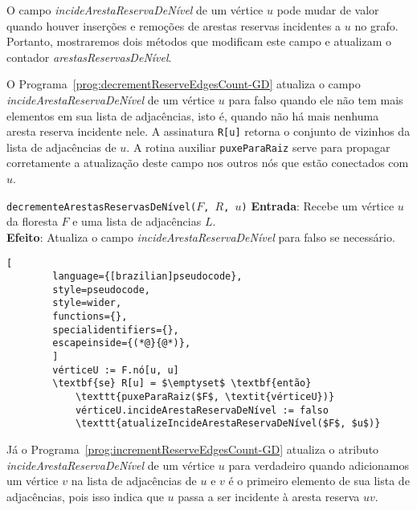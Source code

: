 O campo \textit{incideArestaReservaDeNível} de um vértice $u$ pode mudar de valor quando houver inserções e remoções de arestas reservas incidentes a $u$ no grafo. Portanto, mostraremos dois métodos que modificam este campo e atualizam o contador \textit{arestasReservasDeNível}.

O Programa~\ref{prog:decrementReserveEdgesCount-GD} atualiza o campo \textit{incideArestaReservaDeNível} de um vértice $u$ para falso quando ele não tem mais elementos em sua lista de adjacências, isto é, quando não há mais nenhuma aresta reserva incidente nele. A assinatura \texttt{R[u]} retorna o conjunto de vizinhos da lista de adjacências de $u$. A rotina auxiliar \texttt{puxeParaRaiz} serve para propagar corretamente a atualização deste campo nos outros nós que estão conectados com $u$.

\begin{programruledcaption}{\texttt{decrementeArestasReservasDeNível($F$, $R$, $u$)} \label{prog:decrementReserveEdgesCount-GD}}
    \noindent\textbf{Entrada}: Recebe um vértice $u$ da floresta $F$ e uma lista de adjacências $L$.\\
    \noindent\textbf{Efeito}: Atualiza o campo \textit{incideArestaReservaDeNível} para falso se necessário.
    \vspace{-0.5\baselineskip}
    \begin{lstlisting}[
        language={[brazilian]pseudocode},
        style=pseudocode,
        style=wider,
        functions={},
        specialidentifiers={},
        escapeinside={(*@}{@*)},
        ]
        vérticeU := F.nó[u, u]
        \textbf{se} R[u] = $\emptyset$ \textbf{então} 
            \texttt{puxeParaRaiz($F$, \textit{vérticeU})}
            vérticeU.incideArestaReservaDeNível := falso
            \texttt{atualizeIncideArestaReservaDeNível($F$, $u$)}
    \end{lstlisting}
    \vspace{-0.5\baselineskip}
\end{programruledcaption}

Já o Programa~\ref{prog:incrementReserveEdgesCount-GD} atualiza o atributo \textit{incideArestaReservaDeNível} de um vértice $u$ para verdadeiro quando adicionamos um vértice $v$ na lista de adjacências de $u$ e $v$ é o primeiro elemento de sua lista de adjacências, pois isso indica que $u$ passa a ser incidente à aresta reserva $uv$.

